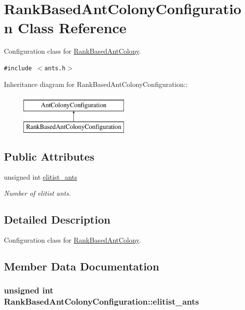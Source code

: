 \hypertarget{classRankBasedAntColonyConfiguration}{
\section{RankBasedAntColonyConfiguration Class Reference}
\label{classRankBasedAntColonyConfiguration}
}
Configuration class for \hyperlink{classRankBasedAntColony}{RankBasedAntColony}.  


{\tt \#include $<$ants.h$>$}

Inheritance diagram for RankBasedAntColonyConfiguration::\begin{figure}[H]
\begin{center}
\leavevmode
\includegraphics[height=2cm]{classRankBasedAntColonyConfiguration}
\end{center}
\end{figure}
\subsection*{Public Attributes}
\begin{CompactItemize}
\item 
unsigned int \hyperlink{classRankBasedAntColonyConfiguration_c75f5c0aad4244275b3bec6ddc6a6c60}{elitist\_\-ants}
\begin{CompactList}\small\item\em Number of elitist ants. \item\end{CompactList}\end{CompactItemize}


\subsection{Detailed Description}
Configuration class for \hyperlink{classRankBasedAntColony}{RankBasedAntColony}. 

\subsection{Member Data Documentation}
\hypertarget{classRankBasedAntColonyConfiguration_c75f5c0aad4244275b3bec6ddc6a6c60}{
\subsubsection[elitist\_\-ants]{\setlength{\rightskip}{0pt plus 5cm}unsigned int {\bf RankBasedAntColonyConfiguration::elitist\_\-ants}}}
\label{classRankBasedAntColonyConfiguration_c75f5c0aad4244275b3bec6ddc6a6c60}


